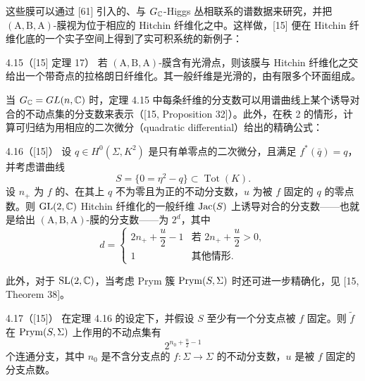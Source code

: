 这些膜可以通过 [61] 引入的、与 $G_{\mathbb{C}}$-Higgs 丛相联系的谱数据来研究，并把 $(\mathrm{A},\mathrm{B},\mathrm{A})$-膜视为位于相应的 Hitchin 纤维化之中。这样做，[15] 便在 Hitchin 纤维化底的一个实子空间上得到了实可积系统的新例子：

\begin{thm}{4.15（[15] 定理 17）} 若 $(\mathrm{A},\mathrm{B},\mathrm{A})$-膜含有光滑点，则该膜与 Hitchin 纤维化之交给出一个带奇点的拉格朗日纤维化。其一般纤维是光滑的，由有限多个环面组成。 \end{thm}

当 $G_{\mathbb{C}} = GL(n,\mathbb{C})$ 时，定理 4.15 中每条纤维的分支数可以用谱曲线上某个诱导对合的不动点集的分支数来表示（[15, Proposition 32]）。此外，在秩 2 的情形，计算可归结为用相应的二次微分（quadratic differential）给出的精确公式：

\begin{thm}{4.16（[15]）} 设 $q \in H^0(\Sigma,K^2)$ 是只有单零点的二次微分，且满足 $f^*(\bar q) = q$，并考虑谱曲线
\[
    S = \{0 = \eta^2 - q\} \subset \operatorname{Tot}(K).
\]
设 $n_+$ 为 $f$ 的、在其上 $q$ 不为零且为正的不动分支数，$u$ 为被 $f$ 固定的 $q$ 的零点数。则 $\mathrm{GL}(2,\mathbb{C})$ Hitchin 纤维化的一般纤维 $\operatorname{Jac}(S)$ 上诱导对合的分支数——也就是给出 $(\mathrm{A},\mathrm{B},\mathrm{A})$-膜的分支数——为 $2^d$，其中
\[
    d = \left\{\begin{array}{ll}
        2n_+ + \dfrac{u}{2} - 1 & \text{若 } 2n_+ + \dfrac{u}{2} > 0,\\[2ex]
        1 & \text{其他情形}.
    \end{array}\right.
\]
\end{thm}

此外，对于 $\mathrm{SL}(2,\mathbb{C})$，当考虑 Prym 簇 $\operatorname{Prym}(S,\Sigma)$ 时还可进一步精确化，见 [15, Theorem 38]。

\begin{thm}{4.17（[15]）} 在定理 4.16 的设定下，并假设 $S$ 至少有一个分支点被 $f$ 固定。则 $\tilde f$ 在 $\operatorname{Prym}(S,\Sigma)$ 上作用的不动点集有
\[
    2^{n_0+\frac{u}{2}-1}
\]
个连通分支，其中 $n_0$ 是不含分支点的 $f : \Sigma \to \Sigma$ 的不动分支数，$u$ 是被 $f$ 固定的分支点数。 \end{thm}

